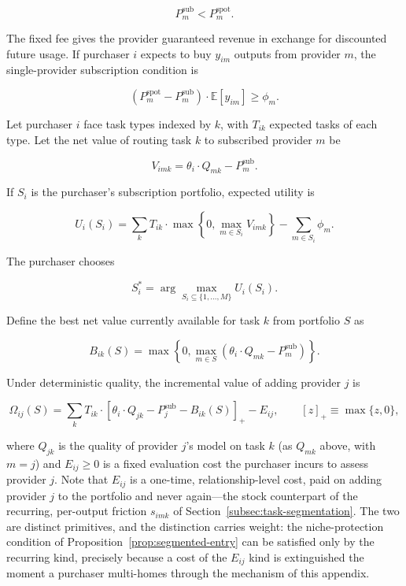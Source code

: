 \documentclass[11pt]{article}
\begin{document}
\begin{equation}P_m^{\mathrm{sub}}<P_m^{\mathrm{spot}}.\end{equation}

The fixed fee gives the provider guaranteed revenue in exchange for discounted future usage. If purchaser $i$ expects to buy $y_{im}$ outputs from provider $m$, the single-provider subscription condition is

\begin{equation}\left(P_m^{\mathrm{spot}}-P_m^{\mathrm{sub}}\right)\cdot\mathbb E[y_{im}]\geq\phi_m.\end{equation}

Let purchaser $i$ face task types indexed by $k$, with $T_{ik}$ expected tasks of each type. Let the net value of routing task $k$ to subscribed provider $m$ be

\begin{equation}V_{imk}=\theta_i\cdot Q_{mk}-P_m^{\mathrm{sub}}.\end{equation}

If $S_i$ is the purchaser's subscription portfolio, expected utility is

\begin{equation}U_i(S_i)=\sum_k T_{ik}\cdot\max\left\{0,\max_{m\in S_i}V_{imk}\right\}-\sum_{m\in S_i}\phi_m.\end{equation}

The purchaser chooses

\begin{equation}S_i^*=\arg\max_{S_i\subseteq\{1,\ldots,M\}}U_i(S_i).\end{equation}

Define the best net value currently available for task $k$ from portfolio $S$ as

\begin{equation}B_{ik}(S)=\max\left\{0,\max_{m\in S}\left(\theta_i\cdot Q_{mk}-P_m^{\mathrm{sub}}\right)\right\}.\end{equation}

Under deterministic quality, the incremental value of adding provider $j$ is

\begin{equation}\Omega_{ij}(S)=\sum_k T_{ik}\cdot\left[\theta_i\cdot Q_{jk}-P_j^{\mathrm{sub}}-B_{ik}(S)\right]_+-E_{ij},\qquad [z]_+\equiv\max\{z,0\},\end{equation}

where $Q_{jk}$ is the quality of provider $j$'s model on task $k$ (as $Q_{mk}$ above, with $m=j$) and $E_{ij}\geq0$ is a fixed evaluation cost the purchaser incurs to assess provider $j$. Note that $E_{ij}$ is a one-time, relationship-level cost, paid on adding provider $j$ to the portfolio and never again---the stock counterpart of the recurring, per-output friction $s_{imk}$ of Section~\ref{subsec:task-segmentation}. The two are distinct primitives, and the distinction carries weight: the niche-protection condition of Proposition~\ref{prop:segmented-entry} can be satisfied only by the recurring kind, precisely because a cost of the $E_{ij}$ kind is extinguished the moment a purchaser multi-homes through the mechanism of this appendix.
\end{document}
